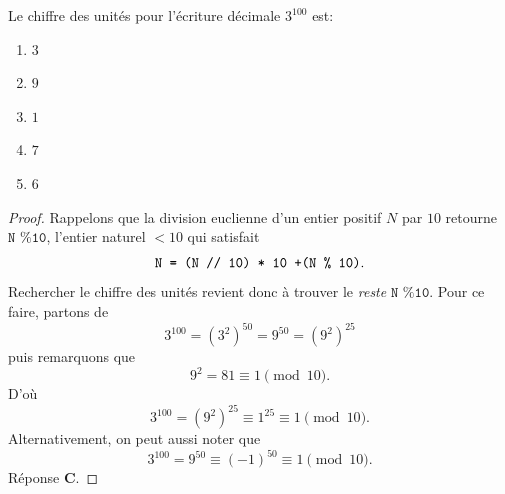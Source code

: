 % 
%
Le chiffre des unités pour l'écriture décimale  $3^{100}$ est:
%
\begin{enumerate}
  \item $3$
  \item $9$
  \item $1$
  \item $7$
  \item $6$
\end{enumerate}
%
\begin{proof}
Rappelons que la division euclienne d'un entier positif $N$ par $10$ retourne $\texttt{N \% 10}$, l'entier naturel $< 10$ %
qui satisfait 
%
\begin{equation}
  \text{\texttt{N = (N // 10) * 10 +(N \% 10)}}.
\end{equation}
%
Rechercher le chiffre des unités revient donc à trouver le \textit{reste} $\texttt{N \% 10}$. Pour ce faire, %
partons de 
%
\begin{equation}
  3^{100} = (3^2)^{50} = 9^{50} =(9^2)^{25}
\end{equation}
%
puis remarquons que 
\begin{equation}
  9^2 = 81 \equiv 1 \pmod{10}.
\end{equation}
%
D'où
%
\begin{equation}
  3^{100} = (9^2)^{25} \equiv 1^{25} \equiv 1 \pmod{10}.
\end{equation}
%
Alternativement, on peut aussi noter que 
%
\begin{equation}
  3^{100} = 9^{50} \equiv (\minus 1)^{50} \equiv 1 \pmod{10}. 
\end{equation}
%
Réponse \textbf{C}.
%
\end{proof}